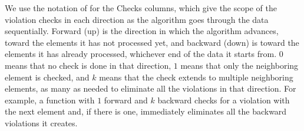 \documentclass{article}
\begin{document}
We use the notation of \citet{busing2022monotone} for the Checks columns, which give the scope of the violation checks in each direction as the algorithm goes through the data sequentially. Forward (up) is the direction in which the algorithm advances, toward the elements it has not processed yet, and backward (down) is toward the elements it has already processed, whichever end of the data it starts from. $0$ means that no check is done in that direction, $1$ means that only the neighboring element is checked, and $k$ means that the check extends to multiple neighboring elements, as many as needed to eliminate all the violations in that direction. For example, a function with $1$ forward and $k$ backward checks for a violation with the next element and, if there is one, immediately eliminates all the backward violations it creates.
\end{document}
